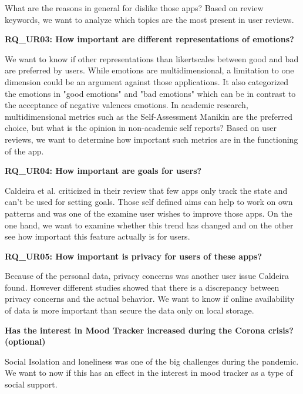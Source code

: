 What are the reasons in general for dislike those apps? 
Based on review keywords, we want to analyze which topics are the most present in user reviews.

\textbf{RQ\_UR03: How important are different representations of emotions?}

We want to know if other representations than likertscales between good and bad are preferred by users.
While emotions are multidimensional, a limitation to one dimension could be an argument against those applications.
It also categorized the emotions in "good emotions" and "bad emotions" which can be in contrast to the acceptance of negative valences emotions.
In academic research, multidimensional metrics such as the Self-Assessment Manikin\cite{bradley1994measuring} are the preferred choice, but what is the opinion in non-academic self reports?
Based on user reviews, we want to determine how important such metrics are in the functioning of the app.


\textbf{RQ\_UR04: How important are goals for users?}

Caldeira et al. criticized in their review that few apps only track the state and can't be used for setting goals\cite{caldeira_mobile_nodate}.
Those self defined aims can help to work on own patterns and was one of the examine user wishes to improve those apps.
On the one hand, we want to examine whether this trend has changed and on the other see how important this feature actually is for users.  

\textbf{RQ\_UR05: How important is privacy for users of these apps?}

Because of the personal data, privacy concerns was another user issue Caldeira found.
However different studies showed that there is a discrepancy between privacy concerns and the actual behavior\cite{BARTH20171038}.
We want to know if online availability of data is more important than secure the data only on local storage.

\textbf{Has the interest in Mood Tracker increased during the Corona crisis? (optional)}

Social Isolation and loneliness was one of the big challenges during the pandemic\cite{loneliness}.
We want to now if this has an effect in the interest in mood tracker as a type of social support.

